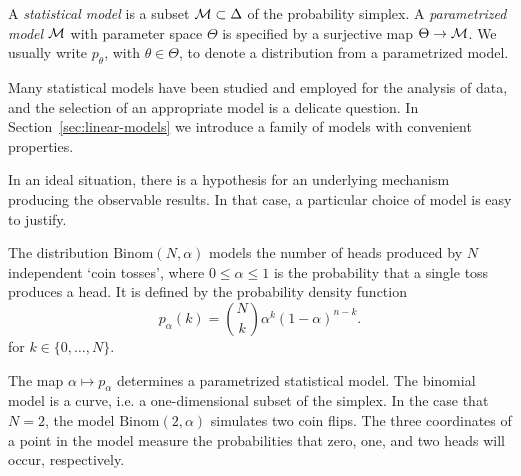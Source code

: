 \documentclass[cclicense]{hmcthesis}
\numberwithin{equation}{chapter}
\numberwithin{ucounter}{chapter}
\begin{document}
    \begin{definition}
    A \emph{statistical model} is a subset $\mathcal{M} \subset \Delta$ of the
    probability simplex.  A \emph{parametrized model} $\mathcal{M}$ with parameter space
    $\Theta$ is specified by a surjective map $\Theta \to \mathcal{M}$.  We usually
    write $p_\theta$, with $\theta \in \Theta$, to denote a distribution from a
    parametrized model.
    \end{definition}

    Many statistical models have been studied and employed for the analysis of
    data, and the selection of an appropriate model is a delicate question.  In
    Section~\ref{sec:linear-models} we introduce a family of models with
    convenient properties.

    In an ideal situation, there is a hypothesis for an underlying mechanism
    producing the observable results.  In that case, a particular choice of
    model is easy to justify.

    \begin{example}

        The distribution $\mathrm{Binom}(N, \alpha)$ models the number of heads
        produced by $N$ independent `coin tosses', where \mbox{$0 \le \alpha \le
        1$} is the probability that a single toss produces a head.  It is
        defined by the probability density function
        \[
            p_\alpha(k) = {N \choose k} \alpha^k(1-\alpha)^{n-k}.
        \]
        for $k \in \{0, \ldots, N\}$.  
    \end{example}
        
    The map $\alpha \mapsto p_\alpha$ determines a parametrized statistical
    model.  The binomial model is a curve, i.e. a one-dimensional subset of the
    simplex.  In the case that $N=2$, the model $\mathrm{Binom}(2, \alpha)$
    simulates two coin flips.  The three coordinates of a point in the model
    measure the probabilities that zero, one, and two heads will occur,
    respectively.
\end{document}
